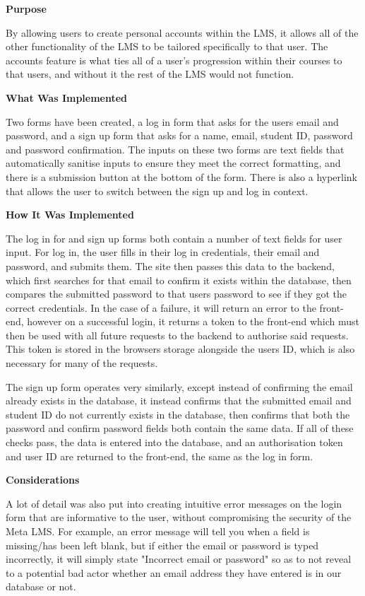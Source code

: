 \textbf{Purpose}

By allowing users to create personal accounts within the LMS, it allows all of the other functionality of the LMS to be tailored specifically to that user. The accounts feature is what ties all of a user's progression within their courses to that users, and without it the rest of the LMS would not function.

\textbf{What Was Implemented}

Two forms have been created, a log in form that asks for the users email and password, and a sign up form that asks for a name, email, student ID, password and password confirmation. The inputs on these two forms are text fields that automatically sanitise inputs to ensure they meet the correct formatting, and there is a submission button at the bottom of the form. There is also a hyperlink that allows the user to switch between the sign up and log in context.

\textbf{How It Was Implemented}

The log in for and sign up forms both contain a number of text fields for user input. For log in, the user fills in their log in credentials, their email and password, and submits them. The site then passes this data to the backend, which first searches for that email to confirm it exists within the database, then compares the submitted password to that users password to see if they got the correct credentials. In the case of a failure, it will return an error to the front-end, however on a successful login, it returns a token to the front-end which must then be used with all future requests to the backend to authorise said requests. This token is stored in the browsers storage alongside the users ID, which is also necessary for many of the requests.

The sign up form operates very similarly, except instead of confirming the email already exists in the database, it instead confirms that the submitted email and student ID do not currently exists in the database, then confirms that both the password and confirm password fields both contain the same data. If all of these checks pass, the data is entered into the database, and an authorisation token and user ID are returned to the front-end, the same as the log in form. 

\textbf{Considerations}

A lot of detail was also put into creating intuitive error messages on the login form that are informative to the user, without compromising the security of the Meta LMS. For example, an error message will tell you when a field is missing/has been left blank, but if either the email or password is typed incorrectly, it will simply state "Incorrect email or password" so as to not reveal to a potential bad actor whether an email address they have entered is in our database or not.

